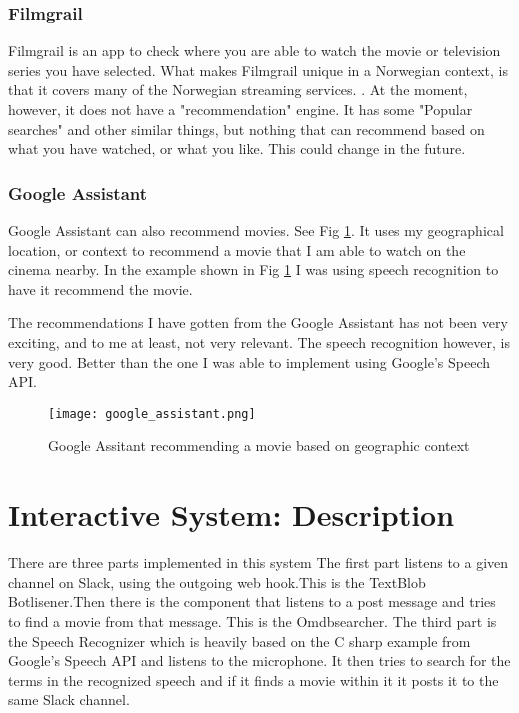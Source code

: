 \documentclass[11pt,fleqn]{book} %
\begin{document}
\subsection{Filmgrail}
Filmgrail is an app to check where you are able to watch the movie or television series you have selected. What makes Filmgrail unique in a Norwegian context, is that it covers many of the Norwegian streaming services. \cite{AmundsenAppenAftenposten}.
At the moment, however, it does not have a "recommendation" engine. It has some "Popular searches" and other similar things, but nothing that can recommend based on what you have watched, or what you like. This could change in the future.
\subsection{Google Assistant}
Google Assistant can also recommend movies. See Fig \ref{fig:google_assistant}. It uses my geographical location, or context to recommend a movie that I am able to watch on the cinema nearby. In the example shown in Fig \ref{fig:google_assistant} I was using speech recognition to have it recommend the movie.

The recommendations I have gotten from the Google Assistant has not been very exciting, and to me at least, not very relevant. The speech recognition however, is very good. Better than the one I was able to implement using Google's Speech API.

\begin{figure}[]
  \centering
   \texttt{[image: google\_assistant.png]}
  \caption{Google Assitant recommending a movie based on geographic context}
  \label{fig:google_assistant}
\end{figure}



\chapter{Interactive System: Description}
There are three parts implemented in this system
The first part listens to a given channel on Slack, using the outgoing web hook\cite{SlackOutgoingSlack}.This is the TextBlob Botlisener.Then there is the component that listens to a post message and tries to find a movie from that message. This is the Omdbsearcher.
The third part is the Speech Recognizer which is heavily based on the C sharp example from Google's Speech API \cite{GoogleCloudPlatformSpeechPlatform} and listens to the microphone. It then tries to search for the terms in the recognized speech and if it finds a movie within it it posts it to the same Slack channel.
\end{document}
